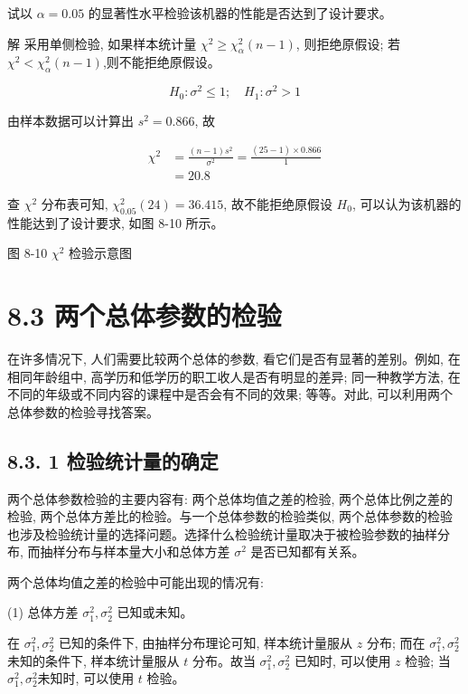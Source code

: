 \documentclass[10pt]{article}
\begin{document}
\begin{CJK*}{UTF8}{bsmi}
试以 $\alpha=0.05$ 的显著性水平检验该机器的性能是否达到了设计要求。

解 采用单侧检验, 如果样本统计量 $\chi^{2} \geqslant \chi_{\alpha}^{2}(n-1)$, 则拒绝原假设; 若 $\chi^{2}<\chi_{\alpha}^{2}(n-1)$,则不能拒绝原假设。

$$
H_{0}: \sigma^{2} \leqslant 1 ; \quad H_{1}: \sigma^{2}>1
$$

由样本数据可以计算出 $s^{2}=0.866$, 故

$$
\begin{aligned}
\chi^{2} & =\frac{(n-1) s^{2}}{\sigma^{2}}=\frac{(25-1) \times 0.866}{1} \\
& =20.8
\end{aligned}
$$

查 $\chi^{2}$ 分布表可知, $\chi_{0.05}^{2}(24)=36.415$, 故不能拒绝原假设 $H_{0}$, 可以认为该机器的性能达到了设计要求, 如图 8-10 所示。

\begin{center}
\end{center}

图 8-10 $\chi^{2}$ 检验示意图

\section*{8.3 两个总体参数的检验}
在许多情况下, 人们需要比较两个总体的参数, 看它们是否有显著的差别。例如, 在相同年龄组中, 高学历和低学历的职工收人是否有明显的差异; 同一种教学方法, 在不同的年级或不同内容的课程中是否会有不同的效果; 等等。对此, 可以利用两个总体参数的检验寻找答案。

\subsection*{8.3. 1 检验统计量的确定}
两个总体参数检验的主要内容有: 两个总体均值之差的检验, 两个总体比例之差的检验, 两个总体方差比的检验。与一个总体参数的检验类似, 两个总体参数的检验也涉及检验统计量的选择问题。选择什么检验统计量取决于被检验参数的抽样分布, 而抽样分布与样本量大小和总体方差 $\sigma^{2}$ 是否已知都有关系。

两个总体均值之差的检验中可能出现的情况有:

(1) 总体方差 $\sigma_{1}^{2}, \sigma_{2}^{2}$ 已知或未知。

在 $\sigma_{1}^{2}, \sigma_{2}^{2}$ 已知的条件下, 由抽样分布理论可知, 样本统计量服从 $z$ 分布; 而在 $\sigma_{1}^{2}, \sigma_{2}^{2}$未知的条件下, 样本统计量服从 $t$ 分布。故当 $\sigma_{1}^{2}, \sigma_{2}^{2}$ 已知时, 可以使用 $z$ 检验; 当 $\sigma_{1}^{2}, \sigma_{2}^{2}$未知时, 可以使用 $t$ 检验。


\end{CJK*}
\end{document}
